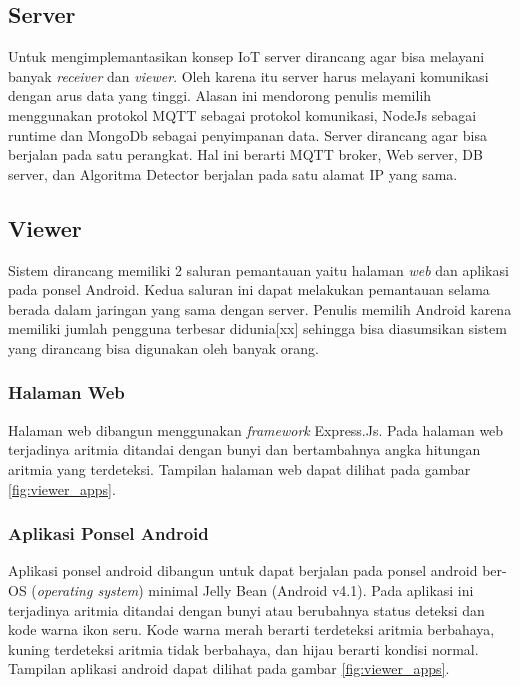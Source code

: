 \subsection{Server}
Untuk mengimplemantasikan konsep IoT server dirancang agar bisa melayani banyak \textit{receiver} dan \textit{viewer}. Oleh karena itu server harus melayani komunikasi dengan arus data yang tinggi. Alasan ini mendorong penulis memilih menggunakan protokol MQTT sebagai protokol komunikasi, NodeJs sebagai runtime dan MongoDb sebagai penyimpanan data. Server dirancang agar bisa berjalan pada satu perangkat. Hal ini berarti MQTT broker, Web server, DB server, dan Algoritma Detector berjalan pada satu alamat IP yang sama. 

\subsection{Viewer}
Sistem dirancang memiliki 2 saluran pemantauan yaitu halaman \textit{web} dan aplikasi pada ponsel Android. Kedua saluran ini dapat melakukan pemantauan selama berada dalam jaringan yang sama dengan server. Penulis memilih Android karena memiliki jumlah pengguna terbesar didunia[xx] sehingga bisa diasumsikan sistem yang dirancang bisa digunakan oleh banyak orang.

\subsubsection{Halaman Web}
Halaman web dibangun menggunakan \textit{framework} Express.Js. Pada halaman web terjadinya aritmia ditandai dengan bunyi dan bertambahnya angka hitungan aritmia yang terdeteksi. Tampilan halaman web dapat dilihat pada gambar \ref{fig:viewer_apps}.

\subsubsection{Aplikasi Ponsel Android}
Aplikasi ponsel android dibangun untuk dapat berjalan pada ponsel android ber-OS (\textit{operating system}) minimal Jelly Bean (Android v4.1). Pada aplikasi ini terjadinya aritmia ditandai dengan bunyi atau berubahnya status deteksi dan kode warna ikon seru. Kode warna merah berarti terdeteksi aritmia berbahaya, kuning terdeteksi aritmia tidak berbahaya, dan hijau berarti kondisi normal. Tampilan aplikasi android dapat dilihat pada gambar \ref{fig:viewer_apps}.

